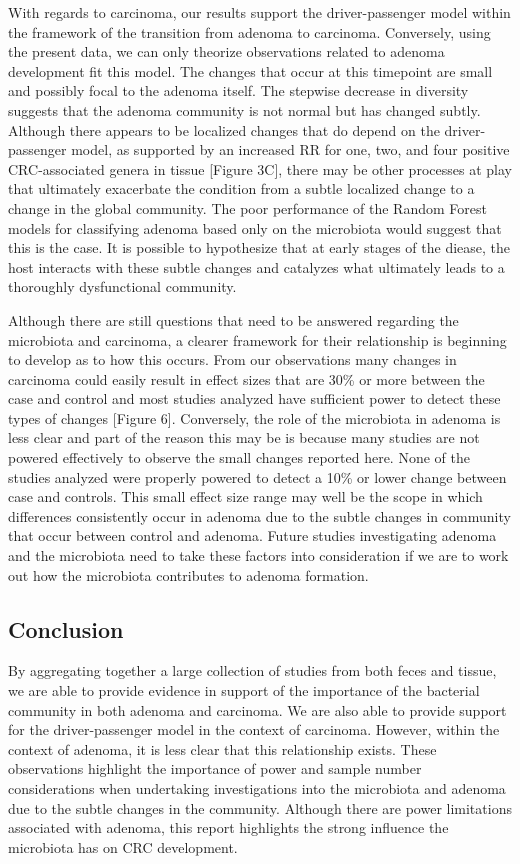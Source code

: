 \documentclass[12pt,]{article}
\begin{document}
With regards to carcinoma, our results support the driver-passenger
model within the framework of the transition from adenoma to carcinoma.
Conversely, using the present data, we can only theorize observations
related to adenoma development fit this model. The changes that occur at
this timepoint are small and possibly focal to the adenoma itself. The
stepwise decrease in diversity suggests that the adenoma community is
not normal but has changed subtly. Although there appears to be
localized changes that do depend on the driver-passenger model, as
supported by an increased RR for one, two, and four positive
CRC-associated genera in tissue {[}Figure 3C{]}, there may be other
processes at play that ultimately exacerbate the condition from a subtle
localized change to a change in the global community. The poor
performance of the Random Forest models for classifying adenoma based
only on the microbiota would suggest that this is the case. It is
possible to hypothesize that at early stages of the diease, the host
interacts with these subtle changes and catalyzes what ultimately leads
to a thoroughly dysfunctional community.

Although there are still questions that need to be answered regarding
the microbiota and carcinoma, a clearer framework for their relationship
is beginning to develop as to how this occurs. From our observations
many changes in carcinoma could easily result in effect sizes that are
30\% or more between the case and control and most studies analyzed have
sufficient power to detect these types of changes {[}Figure 6{]}.
Conversely, the role of the microbiota in adenoma is less clear and part
of the reason this may be is because many studies are not powered
effectively to observe the small changes reported here. None of the
studies analyzed were properly powered to detect a 10\% or lower change
between case and controls. This small effect size range may well be the
scope in which differences consistently occur in adenoma due to the
subtle changes in community that occur between control and adenoma.
Future studies investigating adenoma and the microbiota need to take
these factors into consideration if we are to work out how the
microbiota contributes to adenoma formation.

\subsection{Conclusion}\label{conclusion}

By aggregating together a large collection of studies from both feces
and tissue, we are able to provide evidence in support of the importance
of the bacterial community in both adenoma and carcinoma. We are also
able to provide support for the driver-passenger model in the context of
carcinoma. However, within the context of adenoma, it is less clear that
this relationship exists. These observations highlight the importance of
power and sample number considerations when undertaking investigations
into the microbiota and adenoma due to the subtle changes in the
community. Although there are power limitations associated with adenoma,
this report highlights the strong influence the microbiota has on CRC
development.
\end{document}
